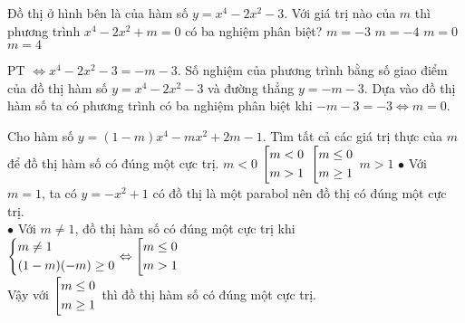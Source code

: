 \begin{ex}%
\immini
{Đồ thị ở hình bên là của hàm số $y=x^4-2x^2-3$. Với giá trị nào của $m$ thì phương trình $x^4-2x^2+m=0$ có ba nghiệm phân biệt?
\choice
{$m=-3$}
{$m=-4$}
{\True $m=0$}
{$m=4$}
}
{
}

\loigiai
{PT $\Leftrightarrow x^4-2x^2-3=-m-3$. Số nghiệm của phương trình bằng số giao điểm của đồ thị hàm số $y=x^4-2x^2-3$ và đường thẳng $y=-m-3$. Dựa vào đồ thị hàm số ta có phương trình có ba nghiệm phân biệt khi $-m-3=-3\Leftrightarrow m=0$.
}
\end{ex}


\begin{ex}%
Cho hàm số $y=(1-m)x^4-mx^2+2m-1$. Tìm tất cả các giá trị thực của $m$ để đồ thị hàm số có đúng một cực trị.
\choice
{$m<0$}
{$\left[\begin{aligned}&m<0\\&m>1\end{aligned}\right.$}
{\True $\left[\begin{aligned}&m\leq0\\&m\geq1\end{aligned}\right.$}
{$m>1$}
\loigiai
{$\bullet$ Với $m=1$, ta có $y=-x^2+1$ có đồ thị là một parabol nên đồ thị có đúng một cực trị.\\
$\bullet$ Với $m\neq 1$, đồ thị hàm số có đúng một cực trị khi $\left\{\begin{aligned}&m\neq 1\\&(1-m)(-m)\geq 0\end{aligned}\right.\Leftrightarrow \left[\begin{aligned}&m\leq 0\\&m>1\end{aligned}\right.$\\
Vậy với $ \left[\begin{aligned}&m\leq 0\\&m\geq 1\end{aligned}\right.$ thì đồ thị hàm số có đúng một cực trị.
}
\end{ex}


